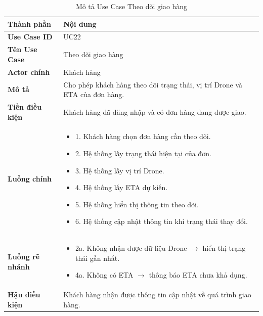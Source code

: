 \begin{longtable}{|L{3cm}|L{11cm}|}
\caption{Mô tả Use Case Theo dõi giao hàng}
\label{tab:mo-ta-uc22-theo-doi-giao-hang}
\\
\hline
\textbf{Thành phần} & \textbf{Nội dung} \\
\hline
\textbf{Use Case ID} & UC22 \\
\hline
\textbf{Tên Use Case} & Theo dõi giao hàng \\
\hline
\textbf{Actor chính} & Khách hàng \\
\hline
\textbf{Mô tả} & Cho phép khách hàng theo dõi trạng thái, vị trí Drone và ETA của đơn hàng. \\
\hline
\textbf{Tiền điều kiện} & Khách hàng đã đăng nhập và có đơn hàng đang được giao. \\
\hline
\textbf{Luồng chính} & \begin{itemize}[leftmargin=*,topsep=2pt,itemsep=2pt]
\item 1. Khách hàng chọn đơn hàng cần theo dõi.
\item 2. Hệ thống lấy trạng thái hiện tại của đơn.
\item 3. Hệ thống lấy vị trí Drone.
\item 4. Hệ thống lấy ETA dự kiến.
\item 5. Hệ thống hiển thị thông tin theo dõi.
\item 6. Hệ thống cập nhật thông tin khi trạng thái thay đổi.
\end{itemize} \\
\hline
\textbf{Luồng rẽ nhánh} & \begin{itemize}[leftmargin=*,topsep=2pt,itemsep=2pt]
\item 2a. Không nhận được dữ liệu Drone $\rightarrow$ hiển thị trạng thái gần nhất.
\item 4a. Không có ETA $\rightarrow$ thông báo ETA chưa khả dụng.
\end{itemize} \\
\hline
\textbf{Hậu điều kiện} & Khách hàng nhận được thông tin cập nhật về quá trình giao hàng. \\
\hline
\end{longtable}

